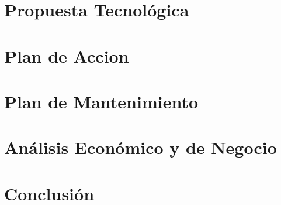 \documentclass[12pt,letterpaper]{article}
\begin{document}
	
	
	
	

	
	




\part{Propuesta Tecnológica}\label{propuesta-tecno}
	


\part{Plan de Accion}\label{plan-accion}
	


\part{Plan de Mantenimiento}\label{plan-mantenimiento}
	


\part{Análisis Económico y de Negocio}\label{analisis-economico}
	
	
	
	


\newpage
\part{Conclusión}\label{conclusion}
	
	\newpage
	
	\newpage
	
	\newpage
	
	

 
\end{document}

